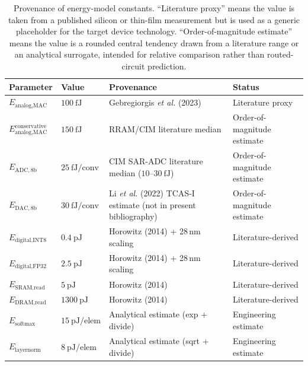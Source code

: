\begin{table}[ht]
\centering
\small
\begin{tabular}{@{}>{\raggedright\arraybackslash}p{}>{\raggedright\arraybackslash}p{}>{\raggedright\arraybackslash}p{}>{\raggedright\arraybackslash}p{}@{}}
\toprule
\textbf{Parameter} & \textbf{Value} & \textbf{Provenance} & \textbf{Status} \\
\midrule
$E_{\text{analog,MAC}}$ & $100~\text{fJ}$ & Gebregiorgis \textit{et al.} (2023) \cite{gebregiorgis2023organiccim} & Literature proxy \\
$E_{\text{analog,MAC}}^{\text{conservative}}$ & $150~\text{fJ}$ & RRAM/CIM literature median & Order-of-magnitude estimate \\
$E_{\text{ADC},8\text{b}}$ & $25~\text{fJ/conv}$ & CIM SAR-ADC literature median ($10$--$30~\text{fJ}$) & Order-of-magnitude estimate \\
$E_{\text{DAC},8\text{b}}$ & $30~\text{fJ/conv}$ & Li \textit{et al.} (2022) TCAS-I estimate (not in present bibliography) & Order-of-magnitude estimate \\
$E_{\text{digital,INT8}}$ & $0.4~\text{pJ}$ & Horowitz (2014) \cite{horowitz2014computing} + 28\,nm scaling & Literature-derived \\
$E_{\text{digital,FP32}}$ & $2.5~\text{pJ}$ & Horowitz (2014) \cite{horowitz2014computing} + 28\,nm scaling & Literature-derived \\
$E_{\text{SRAM,read}}$ & $5~\text{pJ}$ & Horowitz (2014) \cite{horowitz2014computing} & Literature-derived \\
$E_{\text{DRAM,read}}$ & $1300~\text{pJ}$ & Horowitz (2014) \cite{horowitz2014computing} & Literature-derived \\
$E_{\text{softmax}}$ & $15~\text{pJ/elem}$ & Analytical estimate (exp + divide) & Engineering estimate \\
$E_{\text{layernorm}}$ & $8~\text{pJ/elem}$ & Analytical estimate (sqrt + divide) & Engineering estimate \\
\bottomrule
\end{tabular}
\caption{Provenance of energy-model constants. ``Literature proxy'' means the value is taken from a published silicon or thin-film measurement but is used as a generic placeholder for the target device technology. ``Order-of-magnitude estimate'' means the value is a rounded central tendency drawn from a literature range or an analytical surrogate, intended for relative comparison rather than routed-circuit prediction.}
\label{tab:energy-provenance}
\end{table}


